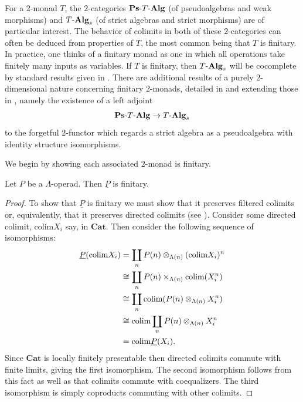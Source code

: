 For a $2$-monad $T$, the $2$-categories $\mathbf{Ps}\mbox{-}T\mbox{-}\mathbf{Alg}$ (of pseudoalgebras and weak morphisms) and $T\mbox{-}\mathbf{Alg}_s$ (of strict algebras and strict morphisms) are of particular interest. The behavior of colimits in both of these $2$-categories can often be deduced from properties of $T$, the most common being that $T$ is finitary. In practice, one thinks of a finitary monad as one in which all operations take finitely many inputs as variables. If $T$ is finitary, then $T\mbox{-}\mathbf{Alg}_s$ will be cocomplete by standard results given in \cite{BKP}. There are additional results of a purely $2$-dimensional nature concerning finitary $2$-monads, detailed in \cite{lack-cod} and extending those in \cite{BKP}, namely the existence of a left adjoint
    \[
        \mathbf{Ps}\mbox{-}T\mbox{-}\mathbf{Alg} \rightarrow T\mbox{-}\mathbf{Alg}_s
    \]
to the forgetful $2$-functor which regards a strict algebra as a pseudoalgebra with identity structure isomorphisms.

We begin by showing each associated $2$-monad is finitary.
\begin{prop}
Let $P$ be a $\Lambda$-operad. Then $\underline{P}$ is finitary.
\end{prop}
\begin{proof}
To show that $\underline{P}$ is finitary we must show that it preserves filtered colimits or, equivalently, that it preserves directed colimits (see \cite{ar}). Consider some directed colimit, $\text{colim}X_{i}$ say, in $\mathbf{Cat}$. Then consider the following sequence of isomorphisms:
    \begin{align*}
      \underline{P}(\text{colim}X_{i}) &= \coprod_n P(n) \otimes_{\Lambda(n)} (\text{colim}X_{i})^{n} \\
      &\cong \coprod_n P(n) \times_{\Lambda(n)} \text{colim}(X_{i}^n) \\
      &\cong \coprod_n \text{colim}(P(n) \otimes_{\Lambda(n)} X_i^{n}) \\
      &\cong \text{colim}\coprod_n P(n) \otimes_{\Lambda(n)} X_i^{n} \\
      &= \text{colim}\underline{P}(X_{i}).
    \end{align*}
Since $\mathbf{Cat}$ is locally finitely presentable then directed colimits commute with finite limits, giving the first isomorphism. The second isomorphism follows from this fact as well as that colimits commute with coequalizers. The third isomorphism is simply coproducts commuting with other colimits.
\end{proof}

